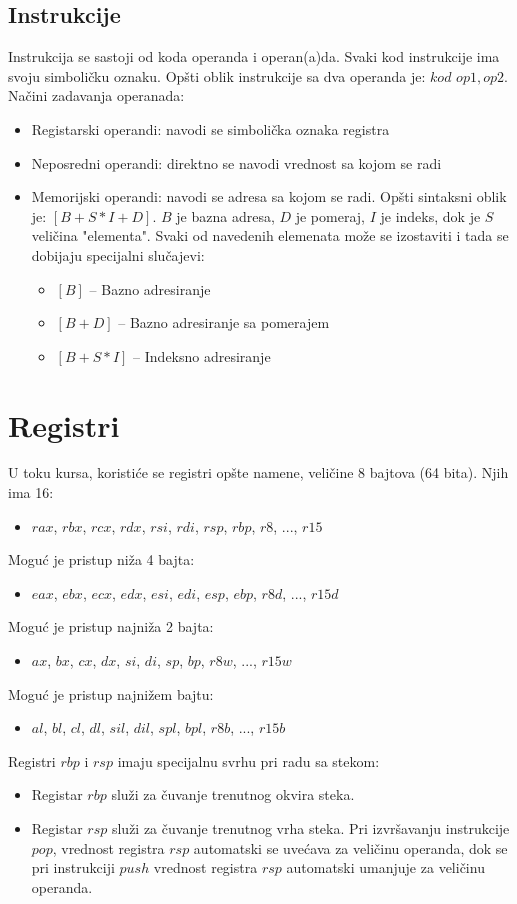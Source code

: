 \documentclass[a4paper, 10pt]{article}
\begin{document}
	\subsection{Instrukcije}
	Instrukcija se sastoji od koda operanda i operan(a)da. Svaki kod instrukcije ima svoju simboličku oznaku. Opšti oblik instrukcije sa dva operanda je: $kod$ $op1, op2$.
Načini zadavanja operanada:	
	\begin{itemize}
		\item Registarski operandi: navodi se simbolička oznaka registra
		\item Neposredni operandi: direktno se navodi vrednost sa kojom se radi
		\item Memorijski operandi: navodi se adresa sa kojom se radi. Opšti sintaksni oblik je: $[B + S*I + D]$. $B$ je bazna adresa, $D$ je pomeraj, $I$ je indeks, dok je $S$ veličina "elementa". Svaki od navedenih elemenata može se izostaviti i tada se dobijaju specijalni slučajevi:
		\begin{itemize}
			\item $[B]$ -- Bazno adresiranje
			\item $[B + D]$ -- Bazno adresiranje sa pomerajem
			\item $[B + S*I]$ -- Indeksno adresiranje
		\end{itemize}
	\end{itemize}
\section{Registri} 
U toku kursa, koristiće se registri opšte namene, veličine 8 bajtova (64 bita). Njih ima 16:
	\begin{itemize}
		\item $rax$, $rbx$, $rcx$, $rdx$, $rsi$, $rdi$, $rsp$, $rbp$, $r8$, ..., $r15$
	\end{itemize}
Moguć je pristup niža 4 bajta:
	\begin{itemize}
		\item $eax$, $ebx$, $ecx$, $edx$, $esi$, $edi$, $esp$, $ebp$, $r8d$, ..., $r15d$
	\end{itemize}
	Moguć je pristup najniža 2 bajta:
	\begin{itemize}
		\item $ax$, $bx$, $cx$, $dx$, $si$, $di$, $sp$, $bp$, $r8w$, ..., $r15w$
	\end{itemize}
	Moguć je pristup najnižem bajtu:
	\begin{itemize}
		\item $al$, $bl$, $cl$, $dl$, $sil$, $dil$, $spl$, $bpl$, $r8b$, ..., $r15b$
	\end{itemize}
Registri $rbp$ i $rsp$ imaju specijalnu svrhu pri radu sa stekom:
	\begin{itemize}
			\item Registar $rbp$ služi za čuvanje trenutnog okvira steka.
			\item Registar $rsp$ služi za čuvanje trenutnog vrha steka. Pri izvršavanju instrukcije $pop$, vrednost registra $rsp$ automatski se uvećava za veličinu operanda, dok se pri instrukciji $push$ vrednost registra $rsp$ automatski umanjuje za veličinu operanda.
	\end{itemize}
\end{document}
